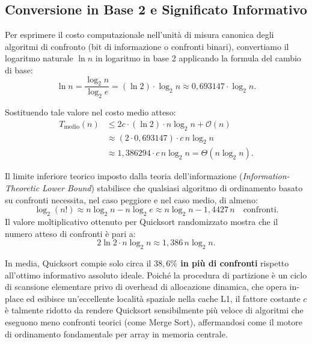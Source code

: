 \subsection{Conversione in Base 2 e Significato Informativo}
\label{subsec:log2-conversion-information}

Per esprimere il costo computazionale nell'unità di misura canonica degli algoritmi di confronto (bit di informazione o confronti binari), convertiamo il logaritmo naturale $\ln n$ in logaritmo in base 2 applicando la formula del cambio di base:
\begin{equation}
  \ln n = \frac{\log_2 n}{\log_2 e} = (\ln 2) \cdot \log_2 n \approx 0{,}693147 \cdot \log_2 n.
\end{equation}

Sostituendo tale valore nel costo medio atteso:
\begin{align}
  T_{\text{medio}}(n) &\le 2c \cdot (\ln 2) \cdot n \log_2 n + \mathcal{O}(n) \\
  &\approx (2 \cdot 0{,}693147) \cdot c \, n \log_2 n \\
  &\approx 1{,}386294 \cdot c \, n \log_2 n = \Theta(n \log_2 n).
\end{align}

\begin{theorem}
Il limite inferiore teorico imposto dalla teoria dell'informazione (\textit{Information-Theoretic Lower Bound}) stabilisce che qualsiasi algoritmo di ordinamento basato su confronti necessita, nel caso peggiore e nel caso medio, di almeno:
\begin{equation}
  \log_2(n!) \approx n \log_2 n - n \log_2 e \approx n \log_2 n - 1{,}4427 \, n \quad \text{confronti}.
\end{equation}
Il valore moltiplicativo ottenuto per Quicksort randomizzato mostra che il numero atteso di confronti è pari a:
\begin{equation}
  2 \ln 2 \cdot n \log_2 n \approx 1{,}386 \, n \log_2 n.
\end{equation}
\end{theorem}

\begin{property}
In media, Quicksort compie solo circa il \textbf{$38{,}6\%$ in più di confronti} rispetto all'ottimo informativo assoluto ideale. Poiché la procedura di partizione è un ciclo di scansione elementare privo di overhead di allocazione dinamica, che opera in-place ed esibisce un'eccellente località spaziale nella cache L1, il fattore costante $c$ è talmente ridotto da rendere Quicksort sensibilmente più veloce di algoritmi che eseguono meno confronti teorici (come Merge Sort), affermandosi come il motore di ordinamento fondamentale per array in memoria centrale.
\end{property}

